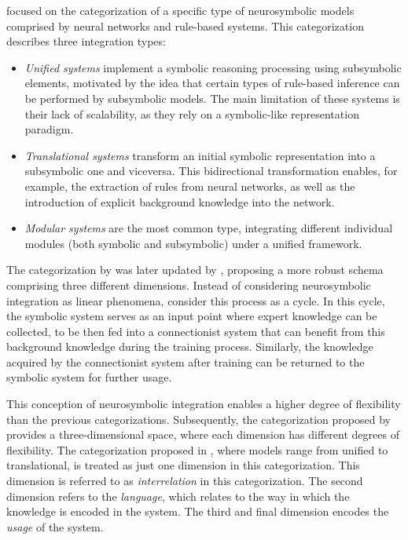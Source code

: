 \cite{mcgarry_hybrid_1999} focused on the categorization of a specific type of neurosymbolic models comprised by neural networks and rule-based systems. This categorization describes three integration types: \begin{itemize}
    \item \textit{Unified systems} implement a symbolic reasoning processing using subsymbolic elements, motivated by the idea that certain types of rule-based inference can be performed by subsymbolic models. The main limitation of these systems is their lack of scalability, as they rely on a symbolic-like representation paradigm.
    \item \textit{Translational systems} transform an initial symbolic representation into a subsymbolic one and viceversa. This bidirectional transformation enables, for example, the extraction of rules from neural networks, as well as the introduction of explicit background knowledge into the network. 
    \item \textit{Modular systems} are the most common type, integrating different individual modules (both symbolic and subsymbolic) under a unified framework.
\end{itemize} 

The categorization by \cite{hilario_overview_nodate} was later updated by \cite{bader_dimensions_2005}, proposing a more robust schema comprising three different dimensions. Instead of considering neurosymbolic integration as linear phenomena, \cite{bader_dimensions_2005} consider this process as a cycle. In this cycle, the symbolic system serves as an input point where expert knowledge can be collected, to be then fed into a connectionist system that can benefit from this background knowledge during the training process. Similarly, the knowledge acquired by the connectionist system after training can be returned to the symbolic system for further usage.

This conception of neurosymbolic integration enables a higher degree of flexibility than the previous categorizations. Subsequently, the categorization proposed by \cite{bader_dimensions_2005} provides a three-dimensional space, where each dimension has different degrees of flexibility. The categorization proposed in \cite{hilario_overview_nodate}, where models range from unified to translational, is treated as just one dimension in this categorization. This dimension is referred to as \textit{interrelation} in this categorization. The second dimension refers to the \textit{language}, which relates to the way in which the knowledge is encoded in the system. The third and final dimension encodes the \textit{usage} of the system.

